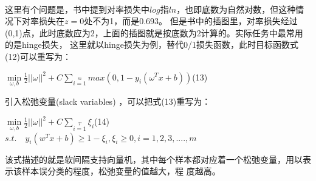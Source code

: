 \documentclass[UTF8]{ctexart}
\begin{document}
{\begin{figure}[ht]
\end{figure}\\
这里有个问题是，书中提到对率损失中$log$指$ln$，也即底数为自然对数，但这种情况下对率损失在$z=0$处不为1，而是0.693。
但是书中的插图里，对率损失经过(0,1)点，此时底数应为2，上面的插图就是按底数为2计算的。实际任务中最常用的是hinge损失，
这里就以hinge损失为例，替代0/1损失函数，此时目标函数式(12)可以重写为：
\begin{center}
    \Large{
        $\min\limits_{\omega,b}\frac{1}{2}||\omega||^2+C\sum\limits_{i=1}\limits^mmax(0,1-y_i(\omega^Tx+b))$\quad(13)
    }
\end{center}
引入松弛变量(slack variables) ，可以把式(13)重写为：
\begin{center}
    \Large{
        $\min\limits_{\omega,b}\frac{1}{2}||\omega||^2+C\sum\limits_{i=1}\limits^T\xi_i$\quad(14)\\[2ex]
        $s.t.\quad y_i(w^Tx+b)\geq 1-\xi_i,\xi_i\geq 0,i=1,2,3,....,m$
    }
\end{center}
该式描述的就是软间隔支持向量机，其中每个样本都对应着一个松弛变量，用以表示该样本误分类的程度，松弛变量的值越大，程
度越高。
}
\end{document}

